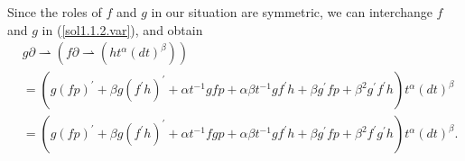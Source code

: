 \documentclass[etingof-lie.tex]{subfiles}
\begin{document}
Since the roles of $f$ and $g$ in our situation are symmetric, we can
interchange $f$ and $g$ in (\ref{sol1.1.2.var}), and obtain%
\begin{align}
&  g\partial\rightharpoonup\left(  f\partial\rightharpoonup\left(  ht^{\alpha
}\left(  dt\right)  ^{\beta}\right)  \right) \nonumber\\
&  =\left(  g\left(  fp\right)  ^{\prime}+\beta g\left(  f^{\prime}h\right)
^{\prime}+\alpha t^{-1}gfp+\alpha\beta t^{-1}gf^{\prime}h+\beta g^{\prime
}fp+\beta^{2}g^{\prime}f^{\prime}h\right)  t^{\alpha}\left(  dt\right)
^{\beta}\nonumber\\
&  =\left(  g\left(  fp\right)  ^{\prime}+\beta g\left(  f^{\prime}h\right)
^{\prime}+\alpha t^{-1}fgp+\alpha\beta t^{-1}gf^{\prime}h+\beta g^{\prime
}fp+\beta^{2}f^{\prime}g^{\prime}h\right)  t^{\alpha}\left(  dt\right)
^{\beta}. \label{sol1.1.3}%
\end{align}
\end{document}
